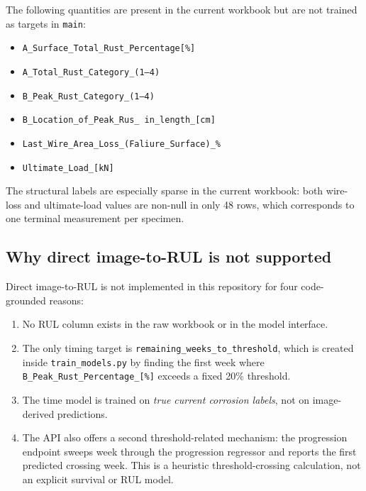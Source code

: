 \documentclass[11pt]{article}
\begin{document}
The following quantities are present in the current workbook but are not trained as targets in \texttt{main}:
\begin{itemize}
  \item \texttt{A\_Surface\_Total\_Rust\_Percentage[\%]}
  \item \texttt{A\_Total\_Rust\_Category\_(1--4)}
  \item \texttt{B\_Peak\_Rust\_Category\_(1--4)}
  \item \texttt{B\_Location\_of\_Peak\_Rus\_\ in\_length\_[cm]}
  \item \texttt{Last\_Wire\_Area\_Loss\_(Faliure\_Surface)\_\%}
  \item \texttt{Ultimate\_Load\_[kN]}
\end{itemize}

The structural labels are especially sparse in the current workbook: both wire-loss and ultimate-load values are non-null in only 48 rows, which corresponds to one terminal measurement per specimen.

\subsection{Why direct image-to-RUL is not supported}
Direct image-to-RUL is not implemented in this repository for four code-grounded reasons:
\begin{enumerate}
  \item No RUL column exists in the raw workbook or in the model interface.
  \item The only timing target is \texttt{remaining\_weeks\_to\_threshold}, which is created inside \texttt{train\_models.py} by finding the first week where \texttt{B\_Peak\_Rust\_Percentage\_[\%]} exceeds a fixed 20\% threshold.
  \item The time model is trained on \emph{true current corrosion labels}, not on image-derived predictions.
  \item The API also offers a second threshold-related mechanism: the progression endpoint sweeps week through the progression regressor and reports the first predicted crossing week. This is a heuristic threshold-crossing calculation, not an explicit survival or RUL model.
\end{enumerate}
\end{document}
